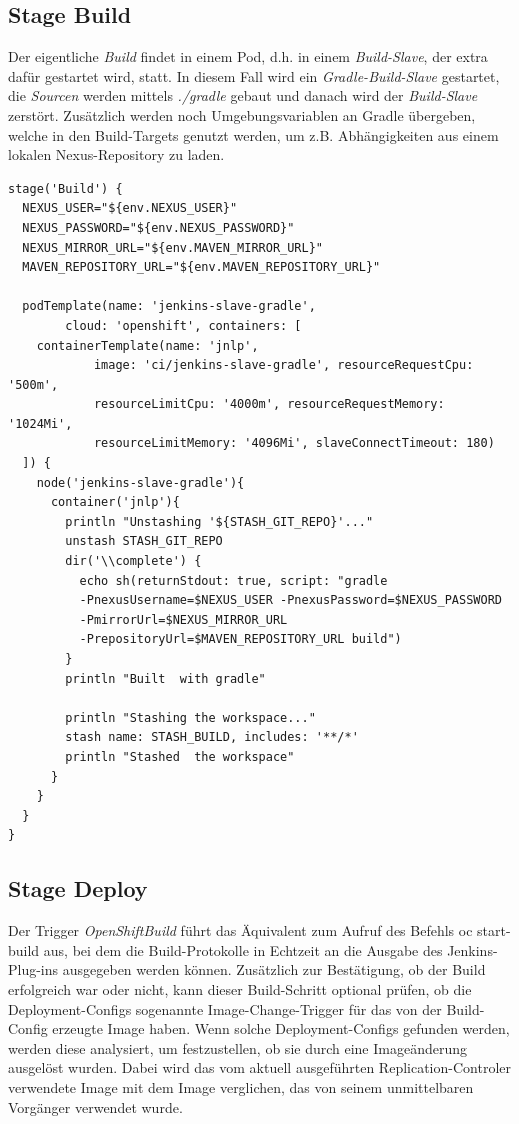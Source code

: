 \subsection{Stage Build}

Der eigentliche \emph{Build} findet in einem Pod, d.h. in einem \emph{Build-Slave}, der extra dafür gestartet wird, statt. In diesem Fall wird ein \emph{Gradle-Build-Slave} gestartet, die \emph{Sourcen} werden mittels \emph{./gradle} gebaut und danach wird der \emph{Build-Slave} zerstört. Zusätzlich werden noch Umgebungsvariablen an Gradle übergeben, welche in den Build-Targets genutzt werden, um z.B. Abhängigkeiten aus einem lokalen Nexus-Repository zu laden.

\begin{verbatim}
stage('Build') {
  NEXUS_USER="${env.NEXUS_USER}"
  NEXUS_PASSWORD="${env.NEXUS_PASSWORD}"
  NEXUS_MIRROR_URL="${env.MAVEN_MIRROR_URL}"
  MAVEN_REPOSITORY_URL="${env.MAVEN_REPOSITORY_URL}"

  podTemplate(name: 'jenkins-slave-gradle',
        cloud: 'openshift', containers: [
    containerTemplate(name: 'jnlp',
            image: 'ci/jenkins-slave-gradle', resourceRequestCpu: '500m', 
            resourceLimitCpu: '4000m', resourceRequestMemory: '1024Mi', 
            resourceLimitMemory: '4096Mi', slaveConnectTimeout: 180)
  ]) {
    node('jenkins-slave-gradle'){
      container('jnlp'){
        println "Unstashing '${STASH_GIT_REPO}'..."
        unstash STASH_GIT_REPO
        dir('\\complete') {
          echo sh(returnStdout: true, script: "gradle 
          -PnexusUsername=$NEXUS_USER -PnexusPassword=$NEXUS_PASSWORD 
          -PmirrorUrl=$NEXUS_MIRROR_URL 
          -PrepositoryUrl=$MAVEN_REPOSITORY_URL build")
        }
        println "Built  with gradle"
          
        println "Stashing the workspace..."
        stash name: STASH_BUILD, includes: '**/*'
        println "Stashed  the workspace"
      }
    }
  }
}
\end{verbatim}

\subsection{Stage Deploy}

Der Trigger \emph{OpenShiftBuild} führt das Äquivalent zum Aufruf des Befehls oc start-build aus, bei dem die Build-Protokolle in Echtzeit an die Ausgabe des Jenkins-Plug-ins ausgegeben werden können. Zusätzlich zur Bestätigung, ob der Build erfolgreich war oder nicht, kann dieser Build-Schritt optional prüfen, ob die Deployment-Configs sogenannte Image-Change-Trigger für das von der Build-Config erzeugte Image haben. Wenn solche Deployment-Configs gefunden werden, werden diese  analysiert, um festzustellen, ob sie durch eine Imageänderung ausgelöst wurden. Dabei wird das vom aktuell ausgeführten Replication-Controler verwendete Image mit dem Image verglichen, das von seinem unmittelbaren Vorgänger verwendet wurde.

